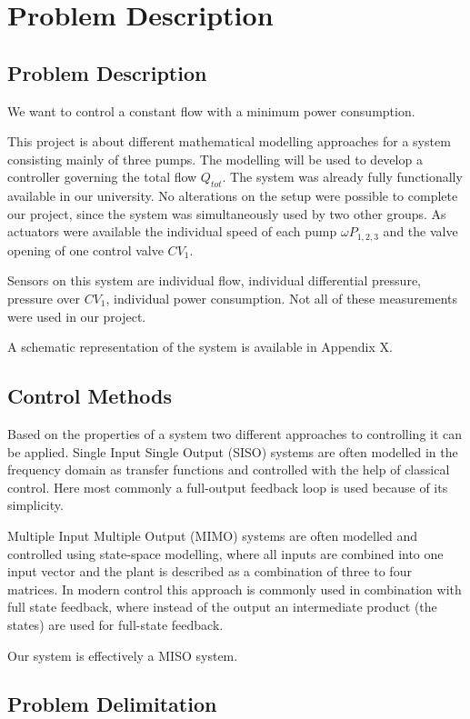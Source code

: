 \chapter{Problem Description}\label{ch:probdesc}

\section{Problem Description}
We want to control a constant flow with a minimum power consumption.

This project is about different mathematical modelling approaches for a system consisting mainly of three pumps.
The modelling will be used to develop a controller governing the total flow $Q_{tot}$.
The system was already fully functionally available in our university.
No alterations on the setup were possible to complete our project,
since the system was simultaneously used by two other groups.
As actuators were available the individual speed of each pump $\omega P_{1,2,3}$ and the valve opening of one control valve $CV_1$.

Sensors on this system are individual flow, individual differential pressure, pressure over $CV_1$, individual power consumption.
Not all of these measurements were used in our project.

A schematic representation of the system is available in Appendix X.


\section{Control Methods}
Based on the properties of a system two different approaches to controlling it can be applied.
Single Input Single Output (SISO) systems are often modelled in the frequency domain
as transfer functions and controlled with the help of classical control.
Here most commonly a full-output feedback loop is used because of its simplicity.
\cite{Franklin2014}

Multiple Input Multiple Output (MIMO) systems are often modelled and controlled using state-space
modelling, where all inputs are combined into one input vector
and the plant is described as a combination of three to four matrices.
In modern control this approach is commonly used in combination with full state feedback,
where instead of the output an intermediate product (the states) are used for full-state feedback.

Our system is effectively a MISO system.





\section{Problem Delimitation}
